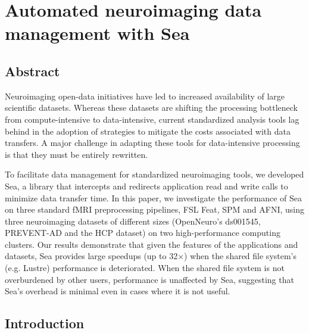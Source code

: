 \chapter{Automated neuroimaging data management with Sea}\label{chapter:sea-neuro}


\section{Abstract}

	Neuroimaging open-data initiatives have led to increased availability of large
  scientific datasets. Whereas these datasets are shifting the processing
  bottleneck from compute-intensive to data-intensive, current standardized
  analysis tools lag behind in the adoption of strategies to mitigate the costs
  associated with data transfers. A major challenge in adapting these tools for
  data-intensive processing is that they must be entirely rewritten.
  
  To facilitate data management for standardized neuroimaging tools, we
  developed Sea, a library that intercepts and redirects application read and
  write calls to minimize data transfer time. In this paper, we investigate the
  performance of Sea on three standard fMRI preprocessing pipelines, FSL Feat,
  SPM and AFNI, using three neuroimaging datasets of different sizes
  (OpenNeuro's ds001545, PREVENT-AD and the HCP dataset) on two high-performance
  computing clusters. Our results demonstrate that given the features of the
  applications and datasets, Sea provides large speedups (up to 32$\times$) when the shared
  file system's (e.g. Lustre) performance is deteriorated.
  When the shared file system is not overburdened by other users, performance is
  unaffected by Sea, suggesting that Sea's overhead is minimal even in cases
  where it is not useful.
  
  \section{Introduction}\label{sec:sea_neuro:introduction}
    
